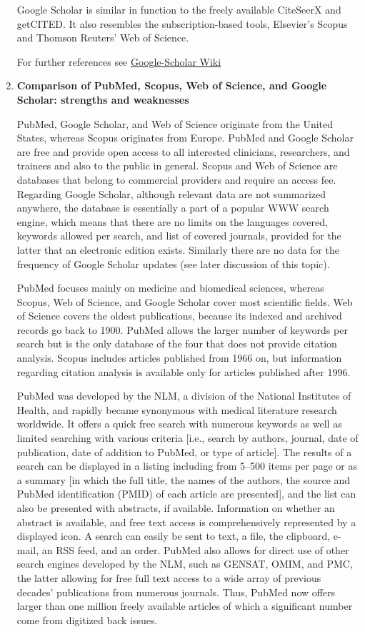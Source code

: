 \begin{enumerate}
	Google Scholar is similar in function to the freely available CiteSeerX and getCITED. It also resembles the subscription-based tools, Elsevier's Scopus and Thomson Reuters' Web of Science.
		
	For further references see \href{https://en.wikipedia.org/wiki/Google_Scholar}{Google-Scholar Wiki}
	
	\item\textbf{Comparison of PubMed, Scopus, Web of Science, and Google Scholar: strengths and weaknesses}
	\setlength{\parindent}{1em}
	
	PubMed, Google Scholar, and Web of Science originate from the United States, whereas Scopus originates from Europe. PubMed and Google Scholar are free and
	provide open access to all interested clinicians, researchers, and trainees and also to the public in general. Scopus and Web of Science are databases that
	belong to commercial providers and require an access fee. Regarding Google Scholar, although relevant data are not summarized anywhere, the database is essentially a part of a popular WWW search engine, which means that there are no limits on the languages covered, keywords allowed per search, and list of covered journals, provided for the latter that an electronic edition exists. Similarly there are no data for the frequency of Google Scholar updates (see later discussion of this topic).
		
	PubMed focuses mainly on medicine and biomedical sciences, whereas Scopus, Web of Science, and Google Scholar cover most scientific fields. Web of Science
	covers the oldest publications, because its indexed and archived records go back to 1900. PubMed allows the larger number of keywords per search but is the only database of the four that does not provide citation analysis. Scopus includes articles published from 1966 on, but information regarding citation analysis is available only for articles published after 1996.
	
	PubMed was developed by the NLM, a division of the National Institutes of Health, and rapidly became synonymous with medical literature research worldwide. It 	offers a quick free search with numerous keywords as well as limited searching with various criteria [i.e., search by authors, journal, date of publication, date of addition to PubMed, or type of article]. The results of	a search can be displayed in a listing including from 5–500 items per page or as a summary [in which the full title, the names of the authors, the source and PubMed identification (PMID) of each article are presented],
	and the list can also be presented with abstracts, if available. Information on whether an abstract is available, and free text access is comprehensively represented by a displayed icon. A search can easily be sent to text, a file, the clipboard, e-mail, an RSS feed, and an 	order. PubMed also allows for direct use of other search engines developed by the NLM, such as GENSAT,
	OMIM, and PMC, the latter allowing for free full text access to a wide array of previous decades’ publications from numerous journals. Thus, PubMed now offers larger than one million freely available articles of which a significant
	number come from digitized back issues.
	

\end{enumerate}
